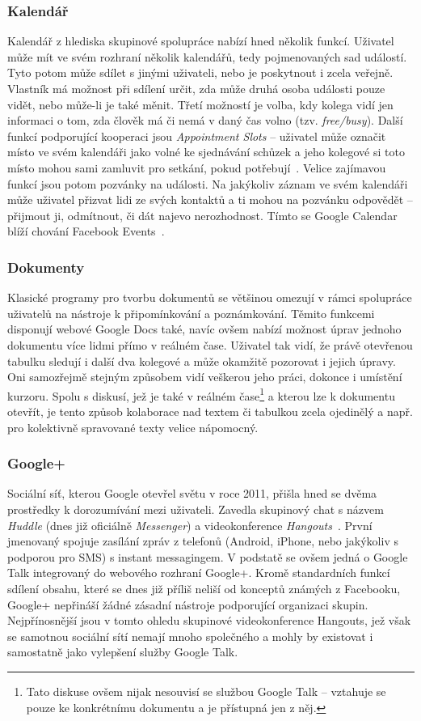 \documentclass[12pt,oneside,final]{fithesis2}
\begin{document}
\subsubsection*{Kalendář}
Kalendář z hlediska skupinové spolupráce nabízí hned několik funkcí. Uživatel může mít ve svém rozhraní několik kalendářů, tedy pojmenovaných sad událostí. Tyto potom může sdílet s jinými uživateli, nebo je poskytnout i zcela veřejně. Vlastník má možnost při sdílení určit, zda může druhá osoba události pouze vidět, nebo může-li je také měnit. Třetí možností je volba, kdy kolega vidí jen informaci o tom, zda člověk má či nemá v daný čas volno (tzv. \emph{free/busy}). Další funkcí podporující kooperaci jsou \emph{Appointment Slots} -- uživatel může označit místo ve svém kalendáři jako volné ke sjednávání schůzek a jeho kolegové si toto místo mohou sami zamluvit pro setkání, pokud potřebují~\cite{chung2010introducing}. Velice zajímavou funkcí jsou potom pozvánky na události. Na jakýkoliv záznam ve svém kalendáři může uživatel přizvat lidi ze svých kontaktů a ti mohou na pozvánku odpovědět -- přijmout ji, odmítnout, či dát najevo nerozhodnost. Tímto se Google Calendar blíží chování Facebook Events~\cite{florescu2010insert}.

\subsubsection*{Dokumenty}
Klasické programy pro tvorbu dokumentů se většinou omezují v rámci spolupráce uživatelů na nástroje k připomínkování a poznámkování. Těmito funkcemi disponují webové Google Docs také, navíc ovšem nabízí možnost úprav jednoho dokumentu více lidmi přímo v reálném čase. Uživatel tak vidí, že právě otevřenou tabulku sledují i další dva kolegové a může okamžitě pozorovat i jejich úpravy. Oni samozřejmě stejným způsobem vidí veškerou jeho práci, dokonce i umístění kurzoru. Spolu s diskusí, jež je také v reálném čase\footnote{Tato diskuse ovšem nijak nesouvisí se službou Google Talk -- vztahuje se pouze ke konkrétnímu dokumentu a je přístupná jen z něj.} a kterou lze k dokumentu otevřít, je tento způsob kolaborace nad textem či tabulkou zcela ojedinělý a např. pro kolektivně spravované texty velice nápomocný.

\subsubsection*{Google+}
Sociální síť, kterou Google otevřel světu v roce 2011, přišla hned se dvěma  prostředky k dorozumívání mezi uživateli. Zavedla skupinový chat s názvem \emph{Huddle} (dnes již oficiálně \emph{Messenger}) a videokonference \emph{Hangouts}~\cite{gundotra2010introducing}. První jmenovaný spojuje zasílání zpráv z telefonů (Android, iPhone, nebo jakýkoliv s podporou pro SMS) s instant messagingem. V podstatě se ovšem jedná o Google Talk integrovaný do webového rozhraní Google+. Kromě standardních funkcí sdílení obsahu, které se dnes již příliš neliší od konceptů známých z Facebooku, Google+ nepřináší žádné zásadní nástroje podporující organizaci skupin. Nejpřínosnější jsou v tomto ohledu skupinové videokonference Hangouts, jež však se samotnou sociální sítí nemají mnoho společného a mohly by existovat i samostatně jako vylepšení služby Google Talk.
\end{document}

